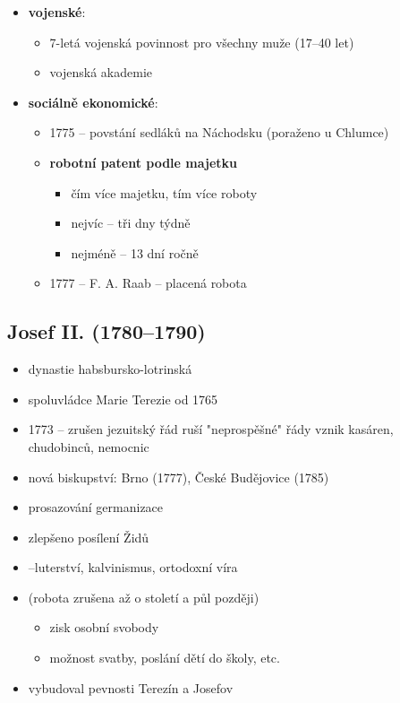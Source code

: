 \begin{itemize}
\item \textbf{vojenské}:
	\begin{itemize}
	\item 7-letá vojenská povinnost pro všechny muže (17--40 let)
	\item vojenská akademie
	\end{itemize}
\item \textbf{sociálně ekonomické}:
	\begin{itemize}
	\item 1775 -- povstání sedláků na Náchodsku (poraženo u Chlumce)
	\item[\ra] \textbf{robotní patent podle majetku}
		\begin{itemize}
		\item čím více majetku, tím více roboty
		\item nejvíc -- tři dny týdně
		\item nejméně -- 13 dní ročně
		\end{itemize}
	\item 1777 -- F. A. Raab -- placená robota
	\end{itemize}
\end{itemize}

\subsection{Josef II. (1780--1790)}
\begin{itemize}
\item dynastie habsbursko-lotrinská
\item spoluvládce Marie Terezie od 1765
\item 1773 -- zrušen jezuitský řád \ra ruší "neprospěšné" řády \ra vznik kasáren, chudobinců, nemocnic
\item nová biskupství: Brno (1777), České Budějovice (1785)
\item prosazování germanizace
\item zlepšeno posílení Židů
\item {} --luterství, kalvinismus, ortodoxní víra
\item {} (robota zrušena až o století a půl později)
	\begin{itemize}
	\item zisk osobní svobody
	\item možnost svatby, poslání dětí do školy, etc.
	\end{itemize}
\item vybudoval pevnosti Terezín a Josefov
\end{itemize}


